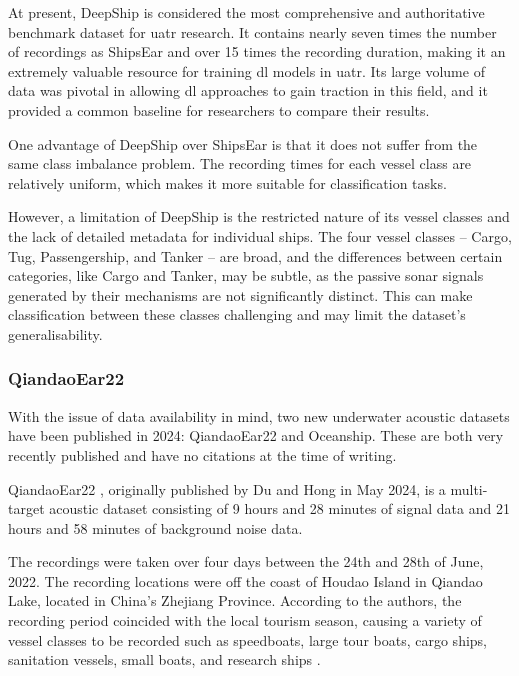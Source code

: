 At present, DeepShip is considered the most comprehensive and authoritative benchmark dataset for \acrshort{uatr} research. It contains nearly seven times the number of recordings as ShipsEar and over 15 times the recording duration, making it an extremely valuable resource for training \acrlong{dl} models in \acrshort{uatr}. Its large volume of data was pivotal in allowing \acrlong{dl} approaches to gain traction in this field, and it provided a common baseline for researchers to compare their results.

One advantage of DeepShip over ShipsEar is that it does not suffer from the same class imbalance problem. The recording times for each vessel class are relatively uniform, which makes it more suitable for classification tasks.

However, a limitation of DeepShip is the restricted nature of its vessel classes and the lack of detailed metadata for individual ships. The four vessel classes -- Cargo, Tug, Passengership, and Tanker -- are broad, and the differences between certain categories, like Cargo and Tanker, may be subtle, as the passive sonar signals generated by their mechanisms are not significantly distinct. This can make classification between these classes challenging and may limit the dataset's generalisability.

\subsubsection{QiandaoEar22}\label{subsubsec:qiandaoear22}

With the issue of data availability in mind, two new underwater acoustic datasets have been published in 2024: QiandaoEar22 and Oceanship. These are both very recently published and have no citations at the time of writing.

QiandaoEar22 \cite{du_qiandaoear22_2024, duQiandaoEar22HighqualityNoise2024}, originally published by Du and Hong in May 2024, is a multi-target acoustic dataset consisting of 9 hours and 28 minutes of signal data and 21 hours and 58 minutes of background noise data.

The recordings were taken over four days between the 24th and 28th of June, 2022. The recording locations were off the coast of Houdao Island in Qiandao Lake, located in China's Zhejiang Province. According to the authors, the recording period coincided with the local tourism season, causing a variety of vessel classes to be recorded such as speedboats, large tour boats, cargo ships, sanitation vessels, small boats, and research ships \cite[5]{du_qiandaoear22_2024}.

